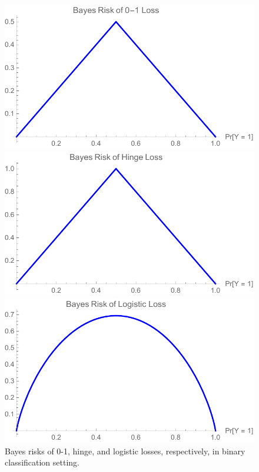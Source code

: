 \documentclass[11pt]{article}
\begin{document}
\begin{figure}
	\begin{minipage}{0.3\linewidth}
	\centering
	\includegraphics[width=0.95\linewidth]{figs/0-1-br.pdf}
	\end{minipage}
	\hfill
	\begin{minipage}{0.3\linewidth}
	\centering		\includegraphics[width=0.95\linewidth]{figs/hinge-br.pdf}
	\end{minipage}
	\hfill
	\begin{minipage}{0.3\linewidth}
	\centering
	\includegraphics[width=0.95\linewidth]{figs/logistic-br.pdf}
\end{minipage}
\caption{Bayes risks of 0-1, hinge, and logistic losses, respectively, in binary classification setting.}
\label{fig:bayes-risks-01}
\end{figure}
\end{document}
